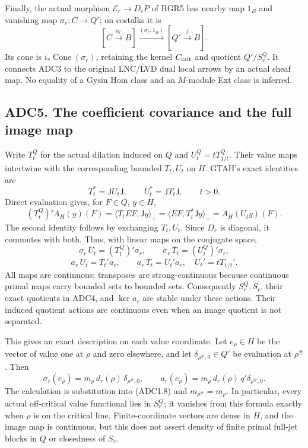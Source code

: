 Finally, the actual morphism \(\mathscr E_r\to D_cP\) of RGR5 has nearby
map \(1_B\) and vanishing map \(\sigma_r:C\to Q'\); on costalks it is \[
[C\xrightarrow{a_r}B]\xrightarrow{(\sigma_r,1_B)}
[Q'\xrightarrow jB].
\tag{ADC4.5}
\] Its cone is \(i_*\operatorname{Cone}(\sigma_r)\), retaining the
kernel \(C_{\rm crit}\) and quotient \(Q'/S_r^Q\). It connects ADC3 to
the original LNC/LVD dual local arrows by an actual sheaf map. No
equality of a Gysin Hom class and an \(M\)-module Ext class is inferred.

\subsection{ADC5. The coefficient covariance and the full image
map}\label{adc5.-the-coefficient-covariance-and-the-full-image-map}

Write \(T_t^Q\) for the actual dilation induced on \(Q\) and
\(U_t^Q=tT_{1/t}^Q\). Their value maps intertwine with the corresponding
bounded \(T_t,U_t\) on \(H\). GTAH's exact identities are \[
T_t^*=\mathsf JU_t\mathsf J,\qquad
U_t^*=\mathsf JT_t\mathsf J,\qquad t>0.
\tag{ADC5.1}
\] Direct evaluation gives, for \(F\in Q\), \(y\in H\), \[
(T_t^Q)'A_H(y)(F)
=\langle T_t EF,\mathsf Jy\rangle_+
=\langle EF,T_t^*\mathsf Jy\rangle_+
=A_H(U_ty)(F).
\] The second identity follows by exchanging \(T_t,U_t\). Since \(D_r\)
is diagonal, it commutes with both. Thus, with linear maps on the
conjugate space, \[
\sigma_r\,\overline U_t=(T_t^Q)'\sigma_r,\qquad
\sigma_r\,\overline T_t=(U_t^Q)'\sigma_r,
\] \[
a_r\,\overline U_t=T_t'a_r,\qquad
a_r\,\overline T_t=U_t'a_r,\quad U_t'=tT_{1/t}'.
\tag{ADC5.2}
\] All maps are continuous; transposes are strong-continuous because
continuous primal maps carry bounded sets to bounded sets. Consequently
\(S_r^Q,S_r\), their exact quotients in ADC4, and \(\ker a_r\) are
stable under these actions. Their induced quotient actions are
continuous even when an image quotient is not separated.

This gives an exact description on each value coordinate. Let
\(e_\rho\in H\) be the vector of value one at \(\rho\) and zero
elsewhere, and let \(\delta_{\rho^\#,0}\in Q'\) be evaluation at
\(\rho^\#\). Then \[
\sigma_r(\overline e_\rho)
=m_\rho\,\overline{d_r(\rho)}\,\delta_{\rho^\#,0},\qquad
a_r(\overline e_\rho)
=m_\rho\,\overline{d_r(\rho)}\,q'\delta_{\rho^\#,0}.
\tag{ADC5.3}
\] The calculation is substitution into (ADC1.8) and
\(m_{\rho^\#}=m_\rho\). In particular, every actual off-critical value
functional lies in \(S_r^Q\); it vanishes from this formula exactly when
\(\rho\) is on the critical line. Finite-coordinate vectors are dense in
\(H\), and the image map is continuous, but this does not assert density
of finite primal full-jet blocks in \(Q\) or closedness of \(S_r\).

